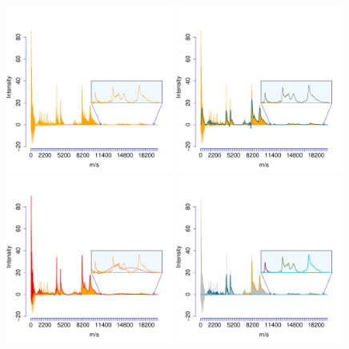 \begin{figure}[t!]
    \centering
    \includegraphics[width=0.49\textwidth]{figures/Fig4LeftTopMS.pdf} 
    \includegraphics[width=0.49\textwidth]{figures/Fig4RightTopMS.pdf} \vspace{-1.2cm}\\
    \includegraphics[width=0.49\textwidth]{figures/Fig4LeftBottomMS.pdf} 
    \includegraphics[width=0.49\textwidth]{figures/Fig4RightBottomMS.pdf} \vspace{-3mm}

\end{figure}

